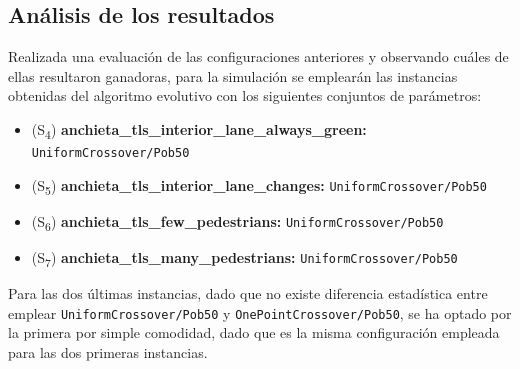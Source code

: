 \subsection{Análisis de los resultados}
\label{subsec:analisis-resultados-configuraciones}

Realizada una evaluación de las configuraciones anteriores y observando cuáles de ellas resultaron ganadoras, para la simulación se emplearán las instancias obtenidas del algoritmo evolutivo con los siguientes conjuntos de parámetros:

\begin{itemize}
    \item (S\textsubscript{4}) \textbf{anchieta\_tls\_interior\_lane\_always\_green:} \texttt{UniformCrossover/Pob50}
    \item (S\textsubscript{5}) \textbf{anchieta\_tls\_interior\_lane\_changes:} \texttt{UniformCrossover/Pob50}
    \item (S\textsubscript{6}) \textbf{anchieta\_tls\_few\_pedestrians:} \texttt{UniformCrossover/Pob50}
    \item (S\textsubscript{7}) \textbf{anchieta\_tls\_many\_pedestrians:} \texttt{UniformCrossover/Pob50}
\end{itemize}

Para las dos últimas instancias, dado que no existe diferencia estadística entre emplear \texttt{UniformCrossover/Pob50} y \texttt{OnePointCrossover/Pob50}, se ha optado por la primera por simple comodidad, dado que es la misma configuración empleada para las dos primeras instancias.


